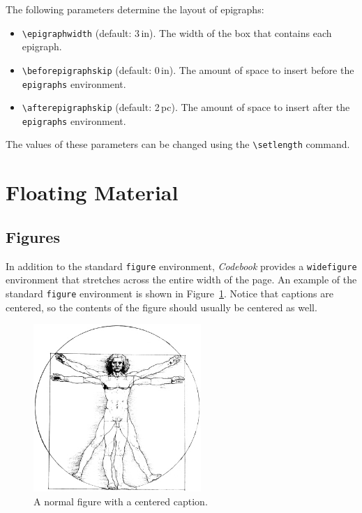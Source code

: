 \documentclass[minted]{codebook}
\begin{document}
The following parameters determine the layout of epigraphs:
\begin{itemize}
  \item \verb|\epigraphwidth| (default: 3\,in). The width of the box that contains each epigraph.

  \item \verb|\beforepigraphskip| (default: 0\,in). The amount of space to insert before the \verb|epigraphs| environment.

  \item \verb|\afterepigraphskip| (default: 2\,pc). The amount of space to insert after the \verb|epigraphs| environment.
\end{itemize}
The values of these parameters can be changed using the \verb|\setlength| command.

\section{Floating Material}

\subsection{Figures}

In addition to the standard \texttt{figure} environment, \emph{Codebook} provides a \texttt{widefigure} environment that stretches across the entire width of the page.
An example of the standard \texttt{figure} environment is shown in Figure~\ref{fig:normal}.
Notice that captions are centered, so the contents of the figure should usually be centered as well.

\begin{figure}
  \centering
  \includegraphics[width=2.5in]{vitruvian}
  \caption{A normal figure with a centered caption.}
  \label{fig:normal}
\end{figure}
\end{document}
